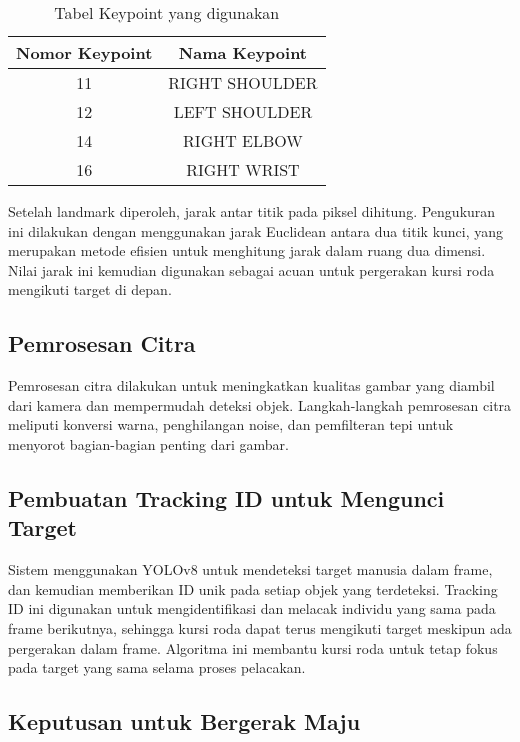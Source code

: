 \begin{table}[H]
\centering
\begin{tabular}{|c|c|}
\hline
Nomor Keypoint & Nama Keypoint \\
\hline
11 & RIGHT SHOULDER \\
12 & LEFT SHOULDER \\
14 & RIGHT ELBOW \\
16 & RIGHT WRIST \\
\hline
\end{tabular}
\caption{Tabel Keypoint yang digunakan}
\label{tab:keypoints}
\end{table}

Setelah landmark diperoleh, jarak antar titik pada piksel dihitung. Pengukuran ini dilakukan dengan menggunakan jarak Euclidean antara dua titik kunci, yang merupakan metode efisien untuk menghitung jarak dalam ruang dua dimensi. Nilai jarak ini kemudian digunakan sebagai acuan untuk pergerakan kursi roda mengikuti target di depan.

\subsection{Pemrosesan Citra}
\label{subsec:pemrosesan_citra}

Pemrosesan citra dilakukan untuk meningkatkan kualitas gambar yang diambil dari kamera dan mempermudah deteksi objek. Langkah-langkah pemrosesan citra meliputi konversi warna, penghilangan noise, dan pemfilteran tepi untuk menyorot bagian-bagian penting dari gambar.

\subsection{Pembuatan Tracking ID untuk Mengunci Target}
\label{subsec:tracking_id}

Sistem menggunakan YOLOv8 untuk mendeteksi target manusia dalam frame, dan kemudian memberikan ID unik pada setiap objek yang terdeteksi. Tracking ID ini digunakan untuk mengidentifikasi dan melacak individu yang sama pada frame berikutnya, sehingga kursi roda dapat terus mengikuti target meskipun ada pergerakan dalam frame. Algoritma ini membantu kursi roda untuk tetap fokus pada target yang sama selama proses pelacakan.

\subsection{Keputusan untuk Bergerak Maju}
\label{subsec:keputusan_bergerak_maju}

